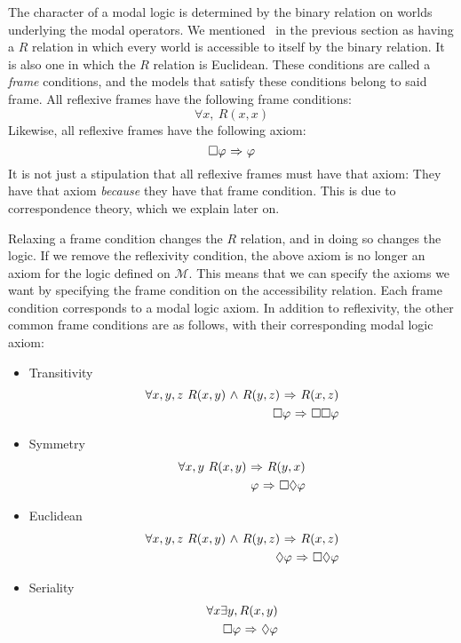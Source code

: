 The character of a modal logic is determined by the binary relation on worlds underlying the modal operators. We mentioned \SFive\ in the previous section as having a $R$ relation in which every world is accessible to itself by the binary relation. It is also one in which the $R$ relation is Euclidean. These conditions are called a \emph{frame} conditions, and the models that satisfy these conditions belong to said frame. All reflexive frames have the following frame conditions:
\begin{equation}
\forall x,\ R(x,x)
\end{equation}
Likewise, all reflexive frames have the following axiom:
\begin{equation}
	\Box \varphi {\ \Rightarrow \ } \varphi
\end{equation}
It is not just a stipulation that all reflexive frames must have that axiom: They have that axiom \emph{because} they have that frame condition. This is due to correspondence theory, which we explain later on.

Relaxing a frame condition changes the $R$ relation, and in doing so changes the logic. If we remove the reflexivity condition, the above axiom is no longer an axiom for the logic defined on $\mathcal{M}$. This means that we can specify the axioms we want by specifying the frame condition on the accessibility relation. Each frame condition corresponds to a modal logic axiom. In addition to reflexivity, the other common frame conditions are as follows, with their corresponding modal logic axiom:
\begin{itemize}
	\item Transitivity
	\begin{eqnarray}
	\forall x,y,z\ R(x,y) {\ \wedge \ } R(y,z) {\ \Rightarrow \ } R(x,z)\\
	\Box \varphi {\ \Rightarrow \ } \Box \Box \varphi
	\end{eqnarray}
	\item Symmetry
	\begin{eqnarray}
	\forall x,y\ R(x,y) {\ \Rightarrow \ } R(y,x)\\
	\varphi {\ \Rightarrow \ } \Box \Diamond \varphi
	\end{eqnarray}
	\item Euclidean
	\begin{eqnarray}
	\forall x,y,z\ R(x,y) {\ \wedge \ } R(y,z) {\ \Rightarrow \ } R(x,z)\\
	\Diamond \varphi {\ \Rightarrow \ } \Box \Diamond \varphi
	\end{eqnarray}
	\item Seriality
	\begin{eqnarray}
	\forall x \exists y, R(x,y) \\
	\Box \varphi {\ \Rightarrow \ } \Diamond \varphi
	\end{eqnarray}
\end{itemize}

